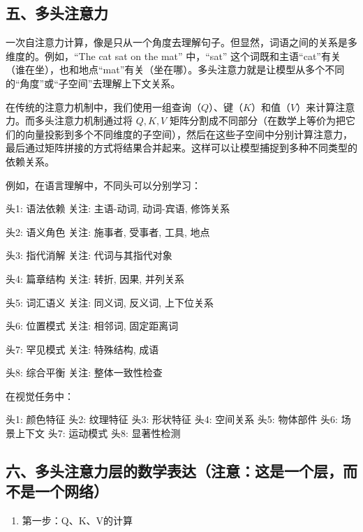 \hypertarget{ux4e94ux591aux5934ux6ce8ux610fux529b}{%
\subsection{五、多头注意力}\label{ux4e94ux591aux5934ux6ce8ux610fux529b}}

一次自注意力计算，像是只从一个角度去理解句子。但显然，词语之间的关系是多维度的。例如，``The cat sat on the mat'' 中，``sat'' 这个词既和主语``cat''有关（谁在坐），也和地点``mat''有关（坐在哪）。多头注意力就是让模型从多个不同的``角度''或``子空间''去理解上下文关系。

在传统的注意力机制中，我们使用一组查询（\(Q\)）、键（\(K\)）和值（\(V\)）来计算注意力。而多头注意力机制通过将 \(Q,K,V\) 矩阵分割成不同部分（在数学上等价为把它们的向量投影到多个不同维度的子空间），然后在这些子空间中分别计算注意力，最后通过矩阵拼接的方式将结果合并起来。这样可以让模型捕捉到多种不同类型的依赖关系。

例如，在语言理解中，不同头可以分别学习：

头1: 语法依赖 关注: 主语-动词, 动词-宾语, 修饰关系

头2: 语义角色 关注: 施事者, 受事者, 工具, 地点

头3: 指代消解 关注: 代词与其指代对象

头4: 篇章结构 关注: 转折, 因果, 并列关系

头5: 词汇语义 关注: 同义词, 反义词, 上下位关系

头6: 位置模式 关注: 相邻词, 固定距离词

头7: 罕见模式 关注: 特殊结构, 成语

头8: 综合平衡 关注: 整体一致性检查

在视觉任务中：

头1: 颜色特征 头2: 纹理特征 头3: 形状特征 头4: 空间关系 头5: 物体部件 头6: 场景上下文 头7: 运动模式 头8: 显著性检测

\hypertarget{ux516dux591aux5934ux6ce8ux610fux529bux5c42ux7684ux6570ux5b66ux8868ux8fbeux6ce8ux610fux8fd9ux662fux4e00ux4e2aux5c42ux800cux4e0dux662fux4e00ux4e2aux7f51ux7edc}{%
\subsection{六、多头注意力层的数学表达（注意：这是一个层，而不是一个网络）}\label{ux516dux591aux5934ux6ce8ux610fux529bux5c42ux7684ux6570ux5b66ux8868ux8fbeux6ce8ux610fux8fd9ux662fux4e00ux4e2aux5c42ux800cux4e0dux662fux4e00ux4e2aux7f51ux7edc}}

\begin{enumerate}
\def\labelenumi{\arabic{enumi}.}
\tightlist
\item
  第一步：Q、K、V的计算
\end{enumerate}

